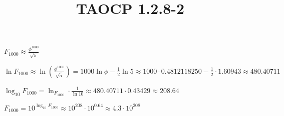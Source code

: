 \documentclass{article}
\title{TAOCP 1.2.8\mbox{-}2}
\begin{document}
\maketitle

\( F_{1000} \approx \frac{\phi^{1000}}{\sqrt{5}} \)

\( \ln{F_{1000}} \approx \ln(\frac{\phi^{1000}}{\sqrt{5}}) = 1000 \ln{\phi} - \frac{1}{2} \ln{5} \approx 1000 \cdot 0.4812118250 - \frac{1}{2} \cdot 1.60943 \approx 480.40711 \)

\( \log_{10}{F_{1000}} = \ln_{F_{1000}} \cdot \frac{1}{\ln{10}} \approx 480.40711 \cdot 0.43429 \approx 208.64 \)

\( F_{1000} = 10^{\log_{10}{F_{1000}}} \approx 10^{208} \cdot 10^{0.64} \approx 4.3 \cdot 10^{208} \)
\end{document}
